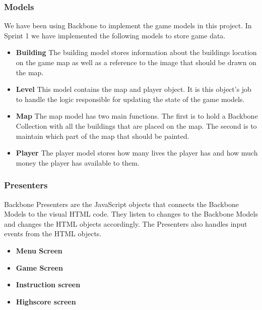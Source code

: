 \subsubsection*{Models}
	We have been using Backbone to implement the game models in this project. In Sprint 1 we have implemented 
	the following models to store game data.
	\begin{itemize}
		\item {\bf Building}
		The building model stores information about the buildings location on the game map as well as a reference 
		to the image that should be drawn on the map.
		\item {\bf Level}
		This model contains the map and player object. It is this object's job to handle the logic responsible for 
		updating the state of the game models.
		\item {\bf Map}
		The map model has two main functions. The first is to hold a Backbone Collection with all the buildings 
		that are placed on the map. The second is to maintain which part of the map that should be painted.
		\item {\bf Player} 
		The player model stores how many lives the player has and how much money the player has available to them.
	\end{itemize}

\subsubsection*{Presenters}
	Backbone Presenters are the JavaScript objects that connects the Backbone Models 
	to the visual HTML code. They listen to changes to the Backbone Models and changes 
	the HTML objects accordingly. The Presenters also handles input events from the HTML objects.
	
	\begin{itemize}
		\item {\bf Menu Screen}
		\item {\bf Game Screen}
		\item {\bf Instruction screen}
		\item {\bf Highscore screen}
	\end{itemize}
	
